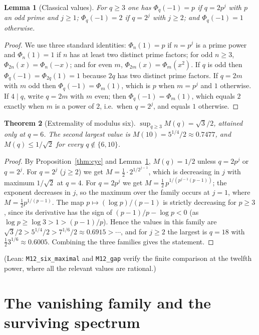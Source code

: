 \documentclass[11pt,a4paper]{article}
\theoremstyle{plain}
\newtheorem{theorem}{Theorem}[section]
\newtheorem{lemma}[theorem]{Lemma}
\theoremstyle{definition}
\theoremstyle{remark}
\newcommand{\Lean}[1]{\texttt{#1}}
\begin{document}
\begin{lemma}[Classical values]\label{lem:phivals}
For $q\ge3$ one has $\Phi_q(-1)=p$ if $q=2p^{j}$ with $p$ an odd prime and
$j\ge1$; $\Phi_q(-1)=2$ if $q=2^{j}$ with $j\ge2$; and $\Phi_q(-1)=1$
otherwise.
\end{lemma}

\begin{proof}
We use three standard identities: $\Phi_n(1)=p$ if $n=p^{j}$ is a prime power
and $\Phi_n(1)=1$ if $n$ has at least two distinct prime factors; for odd
$n\ge3$, $\Phi_{2n}(x)=\Phi_n(-x)$; and for even $m$, $\Phi_{2m}(x)=\Phi_m(x^2)$.
If $q$ is odd then $\Phi_q(-1)=\Phi_{2q}(1)=1$ because $2q$ has two distinct
prime factors. If $q=2m$ with $m$ odd then $\Phi_q(-1)=\Phi_m(1)$, which is $p$
when $m=p^{j}$ and $1$ otherwise. If $4\mid q$, write $q=2m$ with $m$ even; then
$\Phi_q(-1)=\Phi_m(1)$, which equals $2$ exactly when $m$ is a power of $2$,
i.e.\ when $q=2^{j}$, and equals $1$ otherwise.
\end{proof}

\begin{theorem}[Extremality of modulus six]\label{thm:six}
$\sup_{q\ge3}M(q)=\sqrt3/2$, attained only at $q=6$. The second largest value is
$M(10)=5^{1/4}/2\approx0.7477$, and $M(q)\le1/\sqrt2$ for every
$q\notin\{6,10\}$.
\end{theorem}

\begin{proof}
By Proposition~\ref{thm:cyc} and Lemma~\ref{lem:phivals}, $M(q)=1/2$ unless
$q=2p^{j}$ or $q=2^{j}$. For $q=2^{j}$ ($j\ge2$) we get
$M=\frac12\cdot2^{1/2^{j-1}}$, which is decreasing in $j$ with maximum
$1/\sqrt2$ at $q=4$. For $q=2p^{j}$ we get
$M=\frac12\,p^{1/(p^{j-1}(p-1))}$; the exponent decreases in $j$, so the maximum
over the family occurs at $j=1$, where $M=\frac12p^{1/(p-1)}$. The map
$p\mapsto(\log p)/(p-1)$ is strictly decreasing for $p\ge3$, since its
derivative has the sign of $(p-1)/p-\log p<0$ (as $\log p\ge\log3>1>(p-1)/p$).
Hence the values in this family are
$\sqrt3/2>5^{1/4}/2>7^{1/6}/2\approx0.6915>\cdots$, and for $j\ge2$ the largest
is $q=18$ with $\frac12 3^{1/6}\approx0.6005$. Combining the three families
gives the statement.
\end{proof}

\noindent
(Lean: \Lean{M12\_six\_maximal} and \Lean{M12\_gap} verify the finite comparison
at the twelfth power, where all the relevant values are rational.)

\section{The vanishing family and the surviving spectrum}\label{sec:vanish}
\end{document}
